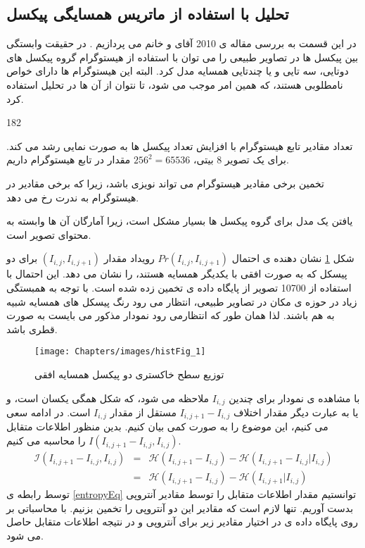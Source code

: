 \subsection{تحلیل با استفاده از ماتریس همسایگی پیکسل}
در این قسمت به بررسی مقاله ی 2010 آقای  و خانم  می پردازیم {\cite{Pevny2010_Steganalysis}}. در حقیقت وابستگی بین پیکسل ها در تصاویر طبیعی را می توان با استفاده از هیستوگرام گروه پیکسل های دوتایی، سه تایی و یا چندتایی همسایه مدل کرد. البته این هیستوگرام ها دارای خواص نامطلوبی هستند، که همین امر موجب می شود، تا نتوان از آن ها در تحلیل استفاده کرد.
\begin{dingautolist}{182}
\item
تعداد مقادیر تابع هیستوگرام با افزایش تعداد پیکسل ها به صورت نمایی رشد می کند. برای یک تصویر 8 بیتی، $ 256^{2}=65536 $ مقدار در تابع هیستوگرام داریم. 
\item
تخمین برخی مقادیر هیستوگرام می تواند نویزی باشد، زیرا که برخی مقادیر در هیستوگرام به ندرت رخ می دهد. 
\item
یافتن یک مدل برای گروه پیکسل ها بسیار مشکل است، زیرا آمارگان آن ها وابسته به محتوای تصویر است. 
\end{dingautolist}
شکل \ref{histFig_1} نشان دهنده ی احتمال $ Pr(I_{i,j},I_{i,j+1}) $ رویداد مقدار $ ( I_{i,j},I_{i,j+1}) $ برای دو پیسکل که به صورت افقی با یکدیگر همسایه هستند، را نشان می دهد. این احتمال با استفاده از 10700 تصویر از پایگاه داده ی   تخمین زده شده است. با توجه به همبستگی زیاد در حوزه ی مکان در تصاویر طبیعی، انتظار می رود رنگ پیسکل های همسایه شبیه به هم باشند. لذا همان طور که انتظارمی رود نمودار مذکور می بایست به صورت قطری باشد. 
\begin{figure}[!htbp]
\centerline{\texttt{[image: Chapters/images/histFig\_1]}}
\caption{توزیع سطح خاکستری دو پیکسل همسایه افقی}
\label{histFig_1}
\end{figure}
با مشاهده ی نمودار برای چندین  {$ I_{i,j} $} ملاحظه می شود، که شکل همگی یکسان است، و یا به عبارت دیگر مقدار اختلاف $ I_{i,j+1}-I_{i,j} $ مستقل از مقدار $ I_{i,j}  $ است. در ادامه سعی می کنیم، این موضوع را به صورت کمی بیان کنیم. بدین منظور اطلاعات متقابل $ I(I_{i,j+1}-I_{i,j},I_{i,j}) $ را محاسبه می کنیم. 
\begin{eqnarray}
\mathcal{I}(I_{i,j+1}-I_{i,j},I_{i,j})&=&\mathcal{H}(I_{i,j+1}-I_{i,j})-\mathcal{H}(I_{i,j+1}-I_{i,j}|I_{i,j})\nonumber\\
&=&\mathcal{H}(I_{i,j+1}-I_{i,j})-\mathcal{H}(I_{i,j+1}|I_{i,j})
\label{entropyEq}
\end{eqnarray}
توسط رابطه ی \ref{entropyEq} توانستیم مقدار اطلاعات متقابل را توسط مقادیر آنتروپی بدست آوریم. تنها لازم است که مقادیر این دو آنتروپی را تخمین بزنیم. با محاسباتی بر روی پایگاه داده ی در اختیار مقادیر زیر برای آنتروپی و در نتیجه اطلاعات متقابل حاصل می شود.
